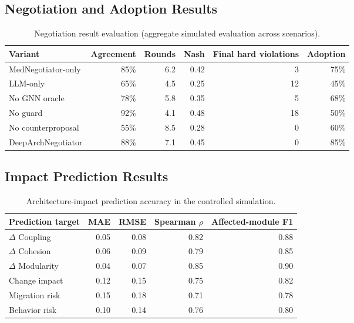 \documentclass[english,preprint,nonatbib]{elsarticle}
\begin{document}
\subsection{Negotiation and Adoption Results}

\begin{table}[H]
\centering
\caption{Negotiation result evaluation (aggregate simulated evaluation across scenarios).}
\label{tab:negotiation-results}
\begin{tabular}{p{3.3cm}rrrrr}
\toprule
Variant & Agreement & Rounds & Nash & Final hard 
violations & Adoption \\
\midrule
MedNegotiator-only & 85\% & 6.2 & 0.42 & 3 & 75\% \\
LLM-only & 65\% & 4.5 & 0.25 & 12 & 45\% \\
No GNN oracle & 78\% & 5.8 & 0.35 & 5 & 68\% \\
No guard & 92\% & 4.1 & 0.48 & 18 & 50\% \\
No counterproposal & 55\% & 8.5 & 0.28 & 0 & 60\% \\
DeepArchNegotiator & 88\% & 7.1 & 0.45 & 0 & 85\% \\
\bottomrule
\end{tabular}
\end{table}

\subsection{Impact Prediction Results}

\begin{table}[H]
\centering
\caption{Architecture-impact prediction accuracy in the controlled simulation.}
\label{tab:impact-results}
\begin{tabular}{p{4.2cm}rrrr}
\toprule
Prediction target & MAE & RMSE & Spearman $\rho$ & Affected-module F1 \\
\midrule
$\Delta$ Coupling & 0.05 & 0.08 & 0.82 & 
0.88 \\
$\Delta$ Cohesion & 0.06 & 0.09 & 0.79 & 0.85 \\
$\Delta$ Modularity & 0.04 & 0.07 & 0.85 & 0.90 \\
Change impact & 0.12 & 0.15 & 0.75 & 0.82 \\
Migration risk & 0.15 & 0.18 & 0.71 & 0.78 \\
Behavior risk & 0.10 & 0.14 & 0.76 & 0.80 \\
\bottomrule
\end{tabular}
\end{table}
\end{document}
